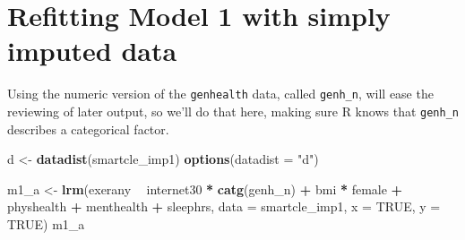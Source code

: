 \documentclass[]{book}
\newenvironment{Shaded}{\begin{snugshade}}{\end{snugshade}}
\newcommand{\KeywordTok}[1]{\textcolor[rgb]{0.13,0.29,0.53}{\textbf{#1}}}
\newcommand{\DataTypeTok}[1]{\textcolor[rgb]{0.13,0.29,0.53}{#1}}
\newcommand{\StringTok}[1]{\textcolor[rgb]{0.31,0.60,0.02}{#1}}
\newcommand{\OtherTok}[1]{\textcolor[rgb]{0.56,0.35,0.01}{#1}}
\newcommand{\OperatorTok}[1]{\textcolor[rgb]{0.81,0.36,0.00}{\textbf{#1}}}
\newcommand{\NormalTok}[1]{#1}
\theoremstyle{definition}
\theoremstyle{definition}
\theoremstyle{definition}
\theoremstyle{remark}
\begin{document}
\section{Refitting Model 1 with simply imputed
data}\label{refitting-model-1-with-simply-imputed-data}

Using the numeric version of the \texttt{genhealth} data, called
\texttt{genh\_n}, will ease the reviewing of later output, so we'll do
that here, making sure R knows that \texttt{genh\_n} describes a
categorical factor.

\begin{Shaded}
\begin{Highlighting}[]
\NormalTok{d <-}\StringTok{ }\KeywordTok{datadist}\NormalTok{(smartcle_imp1)}
\KeywordTok{options}\NormalTok{(}\DataTypeTok{datadist =} \StringTok{"d"}\NormalTok{)}

\NormalTok{m1_a <-}\StringTok{ }\KeywordTok{lrm}\NormalTok{(exerany }\OperatorTok{~}\StringTok{ }\NormalTok{internet30 }\OperatorTok{*}\StringTok{ }\KeywordTok{catg}\NormalTok{(genh_n) }\OperatorTok{+}\StringTok{ }\NormalTok{bmi }\OperatorTok{*}\StringTok{ }\NormalTok{female }\OperatorTok{+}
\StringTok{              }\NormalTok{physhealth }\OperatorTok{+}\StringTok{ }\NormalTok{menthealth }\OperatorTok{+}\StringTok{ }\NormalTok{sleephrs, }
          \DataTypeTok{data =}\NormalTok{ smartcle_imp1, }\DataTypeTok{x =} \OtherTok{TRUE}\NormalTok{, }\DataTypeTok{y =} \OtherTok{TRUE}\NormalTok{)}
\NormalTok{m1_a}
\end{Highlighting}
\end{Shaded}
\end{document}
